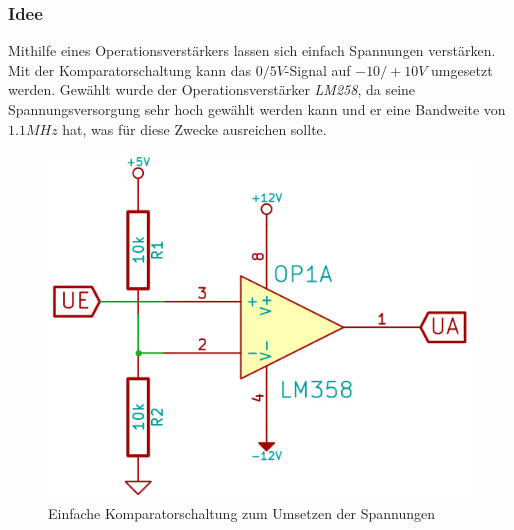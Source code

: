 \subsubsection{Idee} %
Mithilfe eines Operationsverstärkers lassen sich einfach Spannungen verstärken. Mit der Komparatorschaltung kann das $0/5V$-Signal auf $-10/+10V$ umgesetzt werden. Gewählt wurde der Operationsverstärker \textit{LM258}, da seine Spannungsversorgung sehr hoch gewählt werden kann und er eine Bandweite von $1.1MHz$ hat, was für diese Zwecke ausreichen sollte.
\begin{figure}[H]
\centering
\includegraphics[scale=0.5]{images/komparatorschaltung.jpg}
\caption{Einfache Komparatorschaltung zum Umsetzen der Spannungen} \label{img:I1} %
\end{figure}

